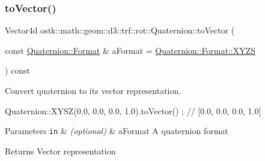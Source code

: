 \mbox{\label{classostk_1_1math_1_1geom_1_1d3_1_1trf_1_1rot_1_1_quaternion_af289de332e7a0033ad7989e64566d1a7}} 
\subsubsection{\texorpdfstring{to\+Vector()}{toVector()}}
{\footnotesize\ttfamily Vector4d ostk\+::math\+::geom\+::d3\+::trf\+::rot\+::\+Quaternion\+::to\+Vector (\begin{DoxyParamCaption}\item[{const \hyperlink{classostk_1_1math_1_1geom_1_1d3_1_1trf_1_1rot_1_1_quaternion_aa7a75f0dd505a58236ee355959e00bfd}{Quaternion\+::\+Format} \&}]{a\+Format = {\ttfamily \hyperlink{classostk_1_1math_1_1geom_1_1d3_1_1trf_1_1rot_1_1_quaternion_aa7a75f0dd505a58236ee355959e00bfda11c51ecd5dc6f86ba3c1ae79e21482f5}{Quaternion\+::\+Format\+::\+X\+Y\+ZS}} }\end{DoxyParamCaption}) const}



Convert quaternion to its vector representation. 


\begin{DoxyCode}
Quaternion::XYSZ(0.0, 0.0, 0.0, 1.0).toVector() ; \textcolor{comment}{// [0.0, 0.0, 0.0, 1.0]}
\end{DoxyCode}



\begin{DoxyParams}[1]{Parameters}
\mbox{\tt in}  & {\em (optional)} & a\+Format A quaternion format \\
\hline
\end{DoxyParams}
\begin{DoxyReturn}{Returns}
Vector representation 
\end{DoxyReturn}
\mbox{\label{classostk_1_1math_1_1geom_1_1d3_1_1trf_1_1rot_1_1_quaternion_a10a7b9bd6bcbcdfe83e304589684c324}} 
